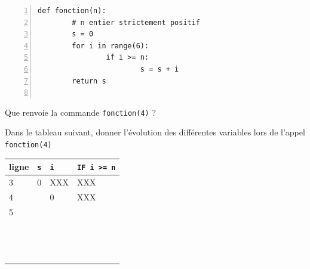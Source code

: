 \documentclass[a4paper,12pt,openany]{book}
\begin{document}
\newpage

\exo 

\begin{minipage}{10cm}
\begin{lstlisting}[numbers=left]
def fonction(n):
		# n entier strictement positif 
		s = 0
		for i in range(6):
				if i >= n:
						s = s + i
		return s
		
\end{lstlisting}
\end{minipage}
\begin{minipage}{8cm}
\begin{liste}
	\item 	Que renvoie la commande \verb+fonction(4)+ ? \dotfill
	
	\dotfill
	
	 	\item Dans le tableau suivant, donner l'évolution des différentes variables lors de l'appel \verb+fonction(4)+

	\end{liste}
\end{minipage}
	




	
\begin{center}
\renewcommand{\arraystretch}{1.2}	
\begin{tabular}{|p{2cm}|p{2cm}|p{2cm}|p{2cm}|}
\hline
ligne & \verb+s+ & \verb+i+ & \verb+IF i >= n+    \\ \hline
3 & 0 & XXX&XXX\\ \hline
4 &  &0 &XXX\\ \hline
5 & & &\\ \hline
 & & &\\ \hline
 & & &\\ \hline
 & & &\\ \hline
 & & &\\ \hline
 & & &\\ \hline
 & & &\\ \hline
 & & &\\ \hline
 & & &\\ \hline
 & & &\\ \hline
 & & &\\ \hline
 & & &\\ \hline
 & & &\\ \hline
 & & &\\ \hline
 & & &\\ \hline


\end{tabular}	
\end{center}
	
\end{document}
